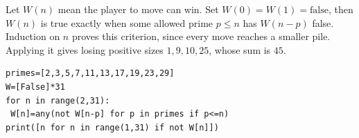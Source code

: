 Let $W(n)$ mean the player to move can win. Set $W(0)=W(1)=\text{false}$, then $W(n)$ is true exactly when some allowed prime $p\le n$ has $W(n-p)$ false. Induction on $n$ proves this criterion, since every move reaches a smaller pile. Applying it gives losing positive sizes $1,9,10,25$, whose sum is $\boxed{45}$.
\begin{verbatim}
primes=[2,3,5,7,11,13,17,19,23,29]
W=[False]*31
for n in range(2,31):
 W[n]=any(not W[n-p] for p in primes if p<=n)
print([n for n in range(1,31) if not W[n]])
\end{verbatim}

